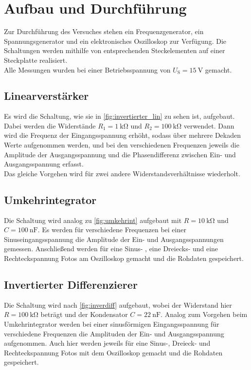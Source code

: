 \newpage
\section{Aufbau und Durchführung}

    \noindent 
    Zur Durchführung des Versuches stehen ein Frequenzgenerator, ein Spannungsgenerator und ein elektronisches Oszilloskop zur Verfügung. 
    Die Schaltungen werden mithilfe von entsprechenden Steckelementen auf einer Steckplatte realisiert. \\ 
    Alle Messungen wurden bei einer Betriebsspannung von $U_\text{S} = \SI{15}{\volt}$ gemacht.

    \subsection{Linearverstärker}

        \noindent 
        Es wird die Schaltung, wie sie in \autoref{fig:invertierter_lin} zu sehen ist, aufgebaut. Dabei werden die Widerstände $R_1 = \SI{1}{\kilo\ohm}$ und 
        $R_2 = \SI{100}{\kilo\ohm}$ verwendet. Dann wird die Frequenz der Eingangsspannung erhöht, sodass über mehrere Dekaden Werte aufgenommen werden, und bei 
        den verschiedenen Frequenzen jeweils die Amplitude der Ausgangsspannung und die Phasendifferenz zwischen Ein- und Ausgangsspannung erfasst. \\
        Das gleiche Vorgehen wird für zwei andere Widerstandsverhältnisse wiederholt. 

    \subsection{Umkehrintegrator}

        \noindent 
        Die Schaltung wird analog zu \autoref{fig:umkehrint} aufgebaut mit $R = \SI{10}{\kilo\ohm}$ und $C = \SI{100}{\nano\farad}$. 
        Es werden für verschiedene Frequenzen bei einer Sinuseingangsspannung die Amplitude der Ein- und Ausgangsspannungen gemessen. 
        Anschließend werden für eine Sinus- , eine Dreiecks- und eine Rechteckspannung Fotos am Oszilloskop gemacht und die Rohdaten gespeichert.

    \subsection{Invertierter Differenzierer}

        \noindent
        Die Schaltung wird nach \autoref{fig:inverdiff} aufgebaut, wobei der Widerstand hier $R= \SI{100}{\kilo\ohm}$ beträgt und der Kondensator 
        $C = \SI{22}{\nano\farad}$. Analog zum Vorgehen beim Umkehrintegrator werden bei einer sinusförmigen Eingangsspannung für verschiedene 
        Frequenzen die Amplituden der Ein- und Ausgangsspannung aufgenommen. Auch hier werden jeweils für eine Sinus-, Dreieck- und Rechteckspannung 
        Fotos mit dem Oszilloskop gemacht und die Rohdaten gespeichert.

